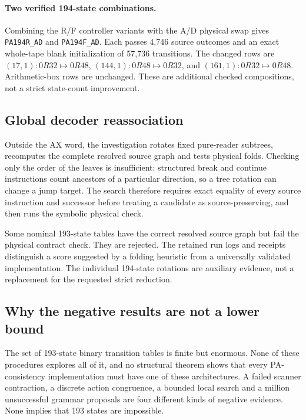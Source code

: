 \documentclass[11pt,letterpaper]{article}
\newcommand{\file}[1]{\texttt{\nolinkurl{#1}}}
\begin{document}
\paragraph{Two verified 194-state combinations.}
Combining the R/F controller variants with the A/D physical swap gives
\file{PA194R_AD} and \file{PA194F_AD}. Each passes 4,746 source outcomes
and an exact whole-tape blank initialization of 57,736 transitions.
The changed rows are $(17,1):0R32\mapsto0R48$,
$(144,1):0R48\mapsto0R32$, and $(161,1):0R32\mapsto0R48$.
Arithmetic-box rows are unchanged. These are additional checked
compositions, not a strict state-count improvement.

\subsection{Global decoder reassociation}

Outside the AX word, the investigation rotates fixed pure-reader subtrees,
recomputes the complete resolved source graph and tests physical folds.
Checking only the order of the leaves is insufficient: structured break and
continue instructions count ancestors of a particular direction, so a tree
rotation can change a jump target. The search therefore requires exact
equality of every source instruction and successor before treating a
candidate as source-preserving, and then runs the symbolic physical check.

Some nominal 193-state tables have the correct resolved source graph but
fail the physical contract check. They are rejected. The retained run logs
and receipts distinguish a score suggested by a folding heuristic from a
universally validated implementation. The individual 194-state rotations
are auxiliary evidence, not a replacement for the requested strict reduction.

\subsection{Why the negative results are not a lower bound}

The set of 193-state binary transition tables is finite but enormous.
None of these procedures explores all of it, and no structural theorem
shows that every PA-consistency implementation must have one of these
architectures. A failed scanner contraction, a discrete action congruence,
a bounded local search and a million unsuccessful grammar proposals are
four different kinds of negative evidence. None implies that 193 states
are impossible.
\end{document}
